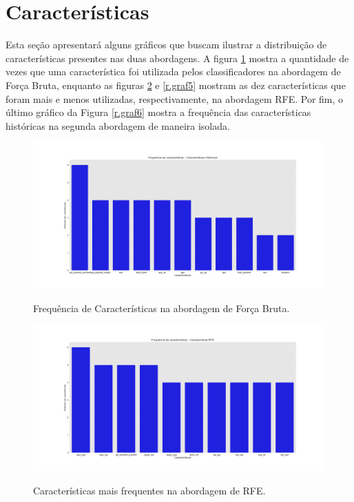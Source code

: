 \section{Características}

Esta seção apresentará alguns gráficos que buscam ilustrar a distribuição de características presentes nas duas abordagens. A figura \ref{r.graf3} mostra a quantidade de vezes que uma característica foi utilizada pelos classificadores na abordagem de Força Bruta, enquanto as figuras \ref{r.graf4} e \ref{r.graf5} mostram as dez características que foram mais e menos utilizadas, respectivamente, na abordagem RFE. Por fim, o último gráfico da Figura \ref{r.graf6} mostra a frequência das características históricas na segunda abordagem de maneira isolada. 

\begin{figure}[h]
\caption{Frequência de Características na abordagem de Força Bruta.}
\centering
\includegraphics[scale=0.35]{figs/CaracteristicasMetodo1.png}
\label{r.graf3}
\end{figure}

\begin{figure}[h]
\caption{Características mais frequentes na abordagem de RFE.}
\centering
\includegraphics[scale=0.35]{figs/CaracteristicasMetodo2.png}
\label{r.graf4}
\end{figure}

